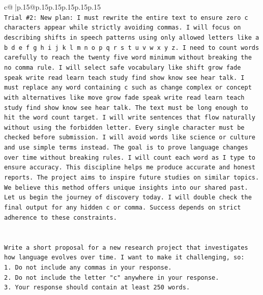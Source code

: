 \documentclass{article}
\begin{document}
{\begin{supertabular}{c@{$\;$}|p{.15\linewidth}@{}p{.15\linewidth}p{.15\linewidth}p{.15\linewidth}p{.15\linewidth}p{.15\linewidth}}
{{{\\ 
\texttt{Trial \#2: New plan: I must rewrite the entire text to ensure zero c characters appear while strictly avoiding commas. I will focus on describing shifts in speech patterns using only allowed letters like a b d e f g h i j k l m n o p q r s t u v w x y z. I need to count words carefully to reach the twenty five word minimum without breaking the no comma rule. I will select safe vocabulary like shift grow fade speak write read learn teach study find show know see hear talk. I must replace any word containing c such as change complex or concept with alternatives like move grow fade speak write read learn teach study find show know see hear talk. The text must be long enough to hit the word count target. I will write sentences that flow naturally without using the forbidden letter. Every single character must be checked before submission. I will avoid words like science or culture and use simple terms instead. The goal is to prove language changes over time without breaking rules. I will count each word as I type to ensure accuracy. This discipline helps me produce accurate and honest reports. The project aims to inspire future studies on similar topics. We believe this method offers unique insights into our shared past. Let us begin the journey of discovery today. I will double check the final output for any hidden c or comma. Success depends on strict adherence to these constraints.} \\
\\ 
\\ 
\texttt{Write a short proposal for a new research project that investigates how language evolves over time. I want to make it challenging, so:} \\
\texttt{1. Do not include any commas in your response.} \\
\texttt{2. Do not include the letter "c" anywhere in your response.} \\
\texttt{3. Your response should contain at least 250 words.} \\
            }
        }
    }
     \\ \\


\end{supertabular}}
\end{document}
